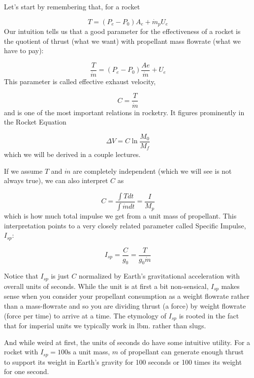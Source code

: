\documentclass[twocolumn]{memoir} %
\begin{document}
Let's start by remembering that, for a rocket

\begin{equation}T = (P_e - P_0)A_e + \dot{m}_pU_e
\end{equation}
%
Our intuition tells us that a good parameter for the effectiveness of a
rocket is the quotient of thrust (what we want) with propellant mass
flowrate (what we have to pay):

\begin{equation}\frac{T}{\dot{m}} = (P_e - P_0)\frac{Ae}{\dot{m}} + U_e
\end{equation}
%
This parameter is called effective exhaust velocity,

\begin{equation}
    C = \frac{T}{\dot{m}}
\end{equation}
%
and is one of the most important relations in rocketry.
It figures prominently in the Rocket Equation

\begin{equation}\Delta V = C \ln \frac{M_0}{M_f}
\end{equation}
%
which we will be derived in a couple lectures.

If we assume $T$ and $\dot{m}$ are completely independent (which we
will see is not always true), we can also interpret $C$ as

\begin{equation}C = \frac{\int T dt}{\int \dot{m} dt} = \frac{I}{M_p}
\end{equation}
%
which is how much total impulse we get from a unit mass of propellant.
This interpretation points to a very closely related parameter called
Specific Impulse, $I_{sp}$:

\begin{equation}I_{sp} = \frac{C}{g_0} = \frac{T}{g_0\dot{m}}
\end{equation}

Notice that $I_{sp}$ is just $C$ normalized by Earth's gravitational
acceleration with overall units of seconds. While the unit is at first a bit
non-sensical, $I_{sp}$ makes sense when you consider your propellant
consumption as a weight flowrate rather than a mass-flowrate and so you
are dividing thrust (a force) by weight flowrate (force per time) to
arrive at a time. The etymology of $I_{sp}$ is rooted in the fact that
for imperial units we typically work in lbm. rather than slugs.

And while weird at first, the units of seconds do have some intuitive
utility. For a rocket with $I_{sp} = 100 \text{s}$ a unit mass, $m$
of propellant can generate enough thrust to support its weight in Earth's
gravity for 100 seconds or 100 times its weight for one second.
\end{document}
